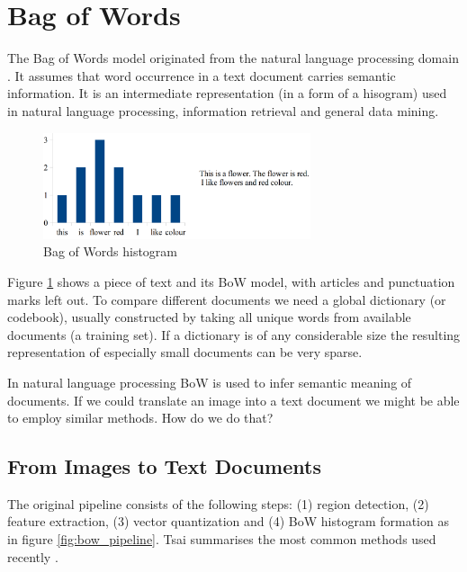 \documentclass[12pt]{article}
\begin{document}
\section{ Bag of Words }

  The Bag of Words model originated from the natural language processing domain 
\cite{tsai2012bag}. It 
assumes that word occurrence in a text document carries semantic information. 
It is an intermediate representation (in a form of a hisogram)
used in natural language processing, information retrieval and general data 
mining. 

  \begin{figure}[!ht]
  \centering
  \includegraphics[width=0.7\textwidth]{../figs/bow_example}
  \caption{Bag of Words histogram}
  \label{fig:bow_example}
  \end{figure}

  Figure \ref{fig:bow_example} shows a piece of text and its BoW model, with 
articles and punctuation marks left out. To compare different 
documents we need a global dictionary (or codebook), usually constructed by 
taking all unique words from available documents (a training set). If 
a dictionary is of any considerable size the resulting representation of 
especially small documents can be very sparse.

  In natural language processing BoW is used to infer semantic meaning of 
documents. If we could translate an image into a text document we might be able 
to employ similar methods. How do we do that?

  \subsection{From Images to Text Documents}	
The original pipeline consists of the following 
steps: (1) region detection, (2) feature extraction, (3) vector quantization 
and (4) BoW histogram formation as in figure \ref{fig:bow_pipeline}. Tsai 
summarises the most common methods used recently \cite{tsai2012bag}. 
\end{document}

